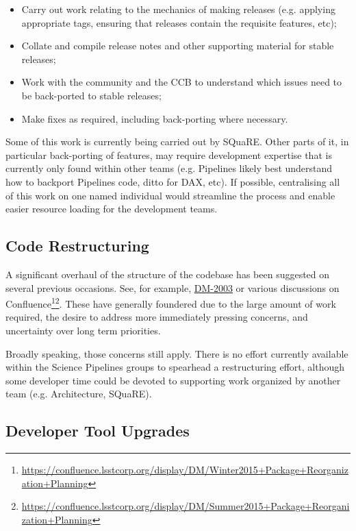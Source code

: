 \documentclass[letterpaper]{scrartcl}
\begin{document}
\begin{itemize}

  \item{Carry out work relating to the mechanics of making releases (e.g.
  applying appropriate tags, ensuring that releases contain the requisite
  features, etc);}
  \item{Collate and compile release notes and other supporting material for
  stable releases;}
  \item{Work with the community and the CCB to understand which issues need to
  be back-ported to stable releases;}
  \item{Make fixes as required, including back-porting where necessary.}

\end{itemize}

Some of this work is currently being carried out by SQuaRE. Other parts of it,
in particular back-porting of features, may require development expertise that
is currently only found within other teams (e.g. Pipelines likely best
understand how to backport Pipelines code, ditto for DAX, etc). If possible,
centralising all of this work on one named individual would streamline the
process and enable easier resource loading for the development teams.

\subsection{Code Restructuring}
\label{sec:restructure}

A significant overhaul of the structure of the codebase has been suggested on
several previous occasions. See, for example,
\href{https://jira.lsstcorp.org/browse/DM-2003}{DM-2003} or various
discussions on
Confluence\footnote{\url{https://confluence.lsstcorp.org/display/DM/Winter2015+Package+Reorganization+Planning}}\footnote{\url{https://confluence.lsstcorp.org/display/DM/Summer2015+Package+Reorganization+Planning}}.
These have generally foundered due to the large amount of work required,
the desire to address more immediately pressing concerns, and uncertainty over
long term priorities.

Broadly speaking, those concerns still apply. There is no effort currently
available within the Science Pipelines groups to spearhead a restructuring
effort, although some developer time could be devoted to supporting work
organized by another team (e.g. Architecture, SQuaRE).

\subsection{Developer Tool Upgrades}
\label{sec:devtools}
\end{document}
